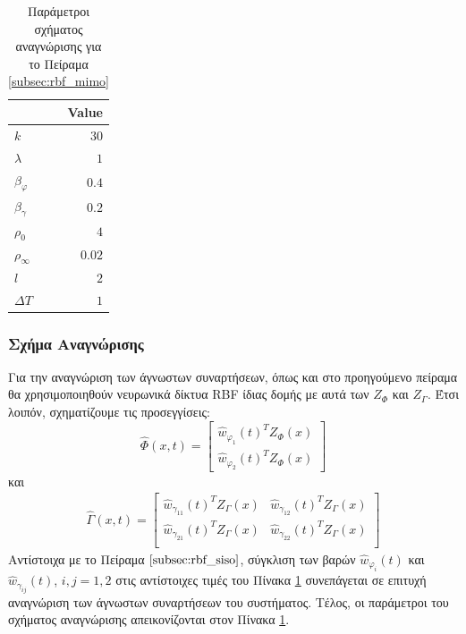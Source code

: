 {
\begin{table}
	\centering
	\captionsetup{format=plain}
	\caption{Παράμετροι σχήματος αναγνώρισης για το Πείραμα \ref{subsec:rbf_mimo}}
	\begin{tabular}{ l | r }
		\hline\hline
		\text{Parameter}  & Value  \\ \hline\hline
		$k$               & $30$   \\ \hline
		$\lambda$         & $1 $   \\ \hline
		$\beta_{\varphi}$ & $0.4$  \\ \hline
		$\beta_{\gamma}$  & $0.2$  \\ \hline
		$\rho_0      $    & $4$    \\ \hline
		$\rho_\infty $    & $0.02$ \\ \hline
		$l           $    & $2$    \\ \hline
		$\textit{ΔΤ} $    & $1$    \\ \hline \hline	
	\end{tabular}
	\label{tab:rbf_mimo_params}
\end{table}
\subsubsection{Σχήμα Αναγνώρισης}
Για την αναγνώριση των άγνωστων συναρτήσεων, όπως και στο προηγούμενο πείραμα θα χρησιμοποιηθούν νευρωνικά δίκτυα RBF ίδιας δομής με αυτά των $Z_\Phi$ και $Z_\Gamma$. Έτσι λοιπόν, σχηματίζουμε τις προσεγγίσεις:
\begin{equation*}
\hat{\Phi}(x,t)  =  
\begin{bmatrix}
\hat{w}_{\varphi_1}(t)^T Z_\Phi(x) \\
\hat{w}_{\varphi_2}(t)^T Z_\Phi(x)
\end{bmatrix}
\end{equation*}
και
\begin{equation*}
\begin{matrix}
\hat{\Gamma}(x,t) = \begin{bmatrix}
\hat{w}_{\gamma_{11}}(t)^T Z_\Gamma(x) 
& \hat{w}_{\gamma_{12}}(t)^T Z_\Gamma(x) \\
\hat{w}_{\gamma_{21}}(t)^T Z_\Gamma(x) 
& \hat{w}_{\gamma_{22}}(t)^T Z_\Gamma(x) \\
\end{bmatrix}
\end{matrix}
\end{equation*}
Αντίστοιχα με το Πείραμα $\ref{subsec:rbf_siso}$, σύγκλιση των βαρών $\hat{w}_{\varphi_i}(t)$ και $\hat{w}_{\gamma_{ij}}(t)$, $i,j = 1,2$ στις αντίστοιχες τιμές του Πίνακα \ref{tab:rbf_mimo_params} συνεπάγεται σε επιτυχή αναγνώριση των άγνωστων συναρτήσεων του συστήματος. Τέλος, οι παράμετροι του σχήματος αναγνώρισης απεικονίζονται στον Πίνακα \ref{tab:rbf_mimo_params}.

}

